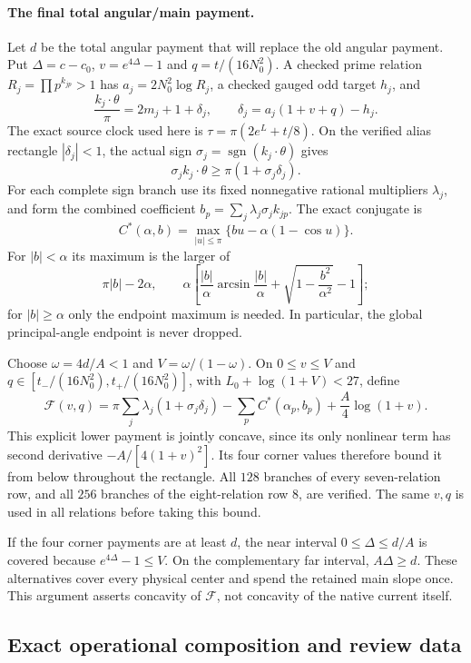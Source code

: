 \documentclass[11pt,a4paper]{article}
\theoremstyle{definition}
\theoremstyle{remark}
\begin{document}
\paragraph{The final total angular/main payment.}
Let $d$ be the total angular payment that will replace the old angular
payment. Put $\Delta=c-c_0$, $v=e^{4\Delta}-1$ and
$q=t/(16N_0^2)$. A checked prime relation $R_j=\prod p^{k_{jp}}>1$
has $a_j=2N_0^2\log R_j$, a checked gauged odd target $h_j$, and
\[
 \frac{k_j\cdot\theta}{\pi}=2m_j+1+\delta_j,
 \qquad\delta_j=a_j(1+v+q)-h_j.
\]
The exact source clock used here is $\tau=\pi(2e^L+t/8)$.
On the verified alias rectangle $|\delta_j|<1$, the actual sign
$\sigma_j=\operatorname{sgn}(k_j\cdot\theta)$ gives
\[
 \sigma_jk_j\cdot\theta\ge\pi(1+\sigma_j\delta_j).
\]
For each complete sign branch use its fixed nonnegative rational
multipliers $\lambda_j$, and form the combined coefficient
$b_p=\sum_j\lambda_j\sigma_jk_{jp}$. The exact conjugate is
\[
 C^*(\alpha,b)=\max_{|u|\le\pi}\{bu-\alpha(1-\cos u)\}.
\]
For $|b|<\alpha$ its maximum is the larger of
\[
 \pi|b|-2\alpha,\qquad
 \alpha\left[\frac{|b|}{\alpha}\arcsin\frac{|b|}{\alpha}
       +\sqrt{1-\frac{b^2}{\alpha^2}}-1\right];
\]
for $|b|\ge\alpha$ only the endpoint maximum is needed. In particular,
the global principal-angle endpoint is never dropped.

Choose $\omega=4d/A<1$ and $V=\omega/(1-\omega)$. On
$0\le v\le V$ and $q\in[t_-/(16N_0^2),t_+/(16N_0^2)]$, with
$L_0+\log(1+V)<27$, define
\[
 \mathcal F(v,q)=\pi\sum_j\lambda_j(1+\sigma_j\delta_j)
       -\sum_p C^*(\alpha_p,b_p)+\frac A4\log(1+v).
\]
This explicit lower payment is jointly concave, since its only nonlinear
term has second derivative $-A/[4(1+v)^2]$. Its four corner values
therefore bound it from below throughout the rectangle. All $128$
branches of every seven-relation row, and all $256$ branches of the
eight-relation row $8$, are verified. The same $v,q$ is used in all
relations before taking this bound.

If the four corner payments are at least $d$, the near interval
$0\le\Delta\le d/A$ is covered because
$e^{4\Delta}-1\le V$. On the complementary far interval,
$A\Delta\ge d$. These alternatives cover every physical center and
spend the retained main slope once. This argument asserts concavity
of $\mathcal F$, not concavity of the native current itself.

\subsection{Exact operational composition and review data}
\end{document}

